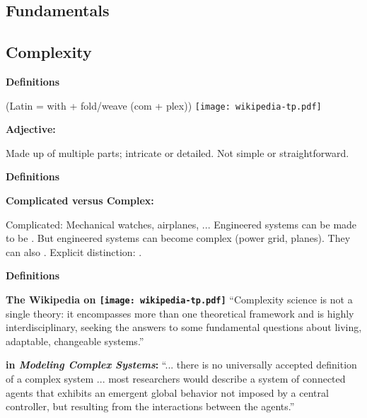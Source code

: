 \begin{frame}[plain]


\section{Fundamentals}

\subsection{Complexity}

  \textbf{Definitions}

   (Latin = with + fold/weave (com + plex))
  \hfill
  \texttt{[image: wikipedia-tp.pdf]}

  \medskip

  \textbf{Adjective:}
    
     Made up of multiple parts; intricate or detailed.
     Not simple or straightforward.
    
  



  \textbf{Definitions}

  \textbf{Complicated versus Complex:}
    
      Complicated: Mechanical watches, airplanes, ...
      Engineered systems can be made to be .
      But engineered systems can become complex (power grid, planes).
      They can also .
      Explicit distinction: .
    
  



  \textbf{Definitions}

  \textbf{
      The Wikipedia on 
      \hfill \texttt{[image: wikipedia-tp.pdf]} 
    }   
    ``Complexity science is not a single theory: 
    it encompasses more than one theoretical framework and is highly
    interdisciplinary, seeking the answers to some fundamental questions
    about living, adaptable, changeable systems.''
  

  \textbf{
       in \textit{Modeling Complex Systems}:}\cite{boccara2004a}
    ``... there is no universally accepted definition
    of a complex system ... most researchers would describe
    a system of connected agents that exhibits
    an emergent global behavior not imposed by a central
    controller, but resulting from the interactions between
    the agents.''
  





\end{frame}
